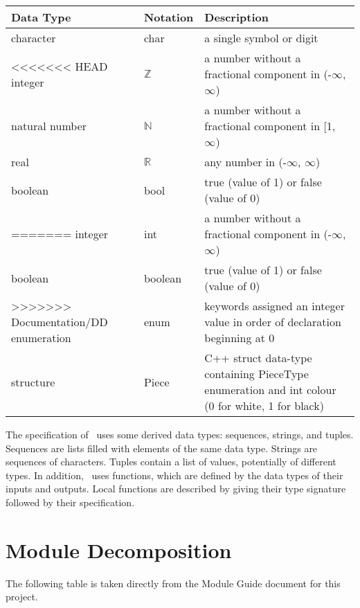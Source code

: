 \documentclass[12pt, titlepage]{article}
\begin{document}
\begin{center}
\renewcommand{\arraystretch}{1.2}
\noindent 
\begin{tabular}{l l p{7.5cm}} 
\toprule 
\textbf{Data Type} & \textbf{Notation} & \textbf{Description}\\ 
\midrule
character & char & a single symbol or digit\\
<<<<<<< HEAD
integer & $\mathbb{Z}$ & a number without a fractional component in (-$\infty$, $\infty$) \\
natural number & $\mathbb{N}$ & a number without a fractional component in [1, $\infty$) \\
real & $\mathbb{R}$ & any number in (-$\infty$, $\infty$)\\
boolean & bool & true (value of 1) or false (value of 0)\\
=======
integer & int & a number without a fractional component in (-$\infty$, $\infty$) \\
boolean & boolean & true (value of 1) or false (value of 0)\\
>>>>>>> Documentation/DD
enumeration & enum & keywords assigned an integer value in order of declaration beginning at 0\\
structure & Piece & C++ struct data-type containing PieceType enumeration and int colour (0 for white, 1 for black)\\
\bottomrule
\end{tabular} 
\end{center}

\noindent
The specification of \progname \ uses some derived data types: sequences, strings, and
tuples. Sequences are lists filled with elements of the same data type. Strings
are sequences of characters. Tuples contain a list of values, potentially of
different types. In addition, \progname \ uses functions, which
are defined by the data types of their inputs and outputs. Local functions are
described by giving their type signature followed by their specification.

\section{Module Decomposition}

The following table is taken directly from the Module Guide document for this project.
\end{document}
